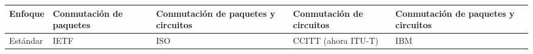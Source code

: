 \begin{longtable}{|>{\raggedright\arraybackslash}m{2.4cm}|>{\raggedright\arraybackslash}m{2.8cm}|>{\raggedright\arraybackslash}m{2.8cm}|>{\raggedright\arraybackslash}m{2.8cm}|>{\raggedright\arraybackslash}m{2.8cm}|}
    Enfoque                 & Conmutación de paquetes                                                                                                                                                                & Conmutación de paquetes y circuitos                                                                                                                                                                                                                  & Conmutación de circuitos                                                                                                                                                                                                                                                                                                                                                         & Conmutación de paquetes y circuitos                                                                                                                                                                                                                                                    \\ \hline
    Estándar                & IETF                                                                                                                                                                                   & ISO                                                                                                                                                                                                                                                  & CCITT (ahora ITU-T)                                                                                                                                                                                                                                                                                                                                                              & IBM                                                                                                                                                                                                                                                                                    \\ \hline

\end{longtable}

